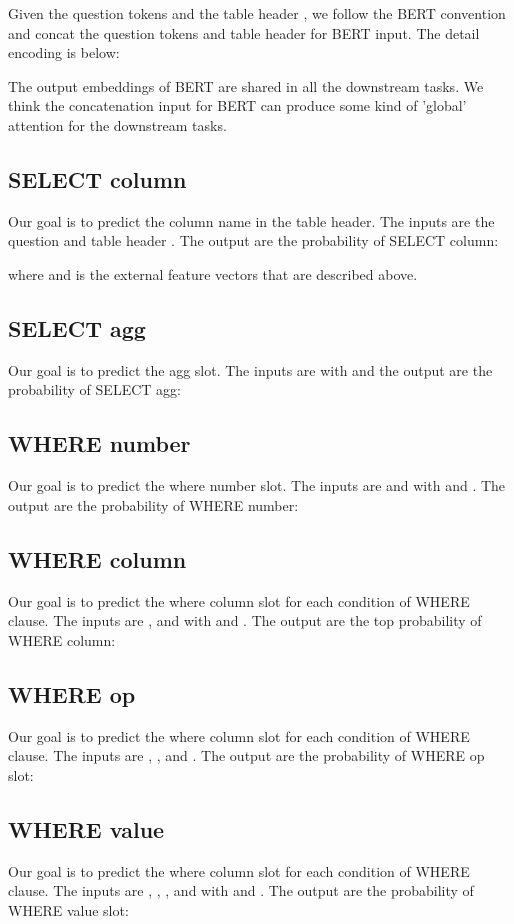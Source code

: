\documentclass{llncs}
\begin{document}
Given the question tokens  and the table header , we follow the BERT convention and concat the question tokens and table header for BERT input. The detail encoding is below:



The output embeddings of BERT are shared in all the downstream tasks. We think the concatenation input for BERT can produce some kind of 'global' attention for the downstream tasks.

\subsection{SELECT column}
Our goal is to predict the column name in the table header. The inputs are the question  and table header . The output are the probability of SELECT column: 

where  and  is the external feature vectors that are described above.
\subsection{SELECT agg}
Our goal is to predict the agg slot. The inputs are   with  and the output are the probability of SELECT agg:


\subsection{WHERE number}

Our goal is to predict the where number slot. The inputs are  and  with  and . The output are the probability of WHERE number:


\subsection{WHERE column}

Our goal is to predict the where column slot for each condition of WHERE clause. The inputs are ,  and  with  and . The output are the top  probability of WHERE column:


\subsection{WHERE op}

Our goal is to predict the where column slot for each condition of WHERE clause. The inputs are , ,  and . The output are the probability of WHERE op slot:


\subsection{WHERE value}
Our goal is to predict the where column slot for each condition of WHERE clause. The inputs are , , ,  and  with  and . The output are the probability of WHERE value slot:
\end{document}
